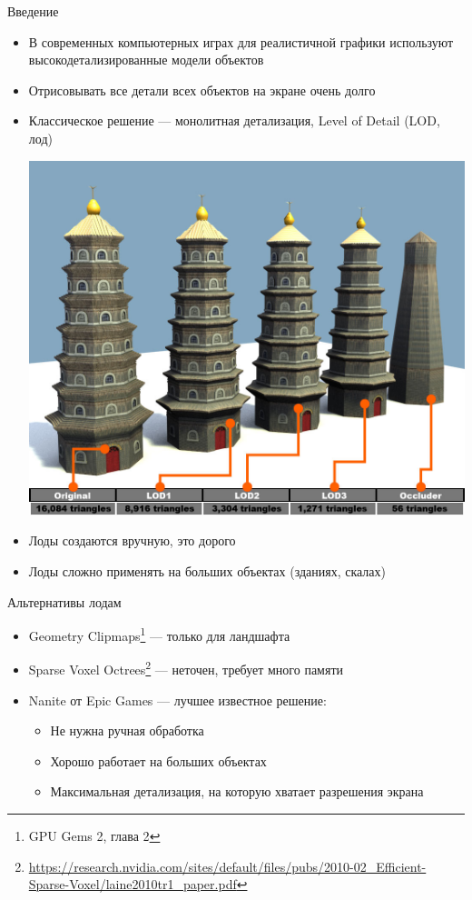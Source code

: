 \begin{frame}{Введение}
    \begin{itemize}
        \item В современных компьютерных играх для реалистичной графики используют высокодетализированные модели объектов
        \item Отрисовывать все детали всех объектов на экране очень долго
        \item Классическое решение --- монолитная детализация, Level of Detail (LOD, лод)
        \begin{center}
            \includegraphics[height=.4\textheight]{pics/lod.jpg}
        \end{center}
        \item Лоды создаются вручную, это дорого
        \item Лоды сложно применять на больших объектах (зданиях, скалах)
    \end{itemize}
\end{frame}

\begin{frame}{Альтернативы лодам}
    \begin{itemize}
        \item Geometry Clipmaps\footnote{GPU Gems 2, глава 2} --- только для ландшафта
        \item Sparse Voxel Octrees\footnote{\url{https://research.nvidia.com/sites/default/files/pubs/2010-02_Efficient-Sparse-Voxel/laine2010tr1_paper.pdf}} --- неточен, требует много памяти
        \item Nanite от Epic Games --- лучшее известное решение:
        \begin{itemize}
            \item Не нужна ручная обработка
            \item Хорошо работает на больших объектах
            \item Максимальная детализация, на которую хватает разрешения экрана
        \end{itemize}
    \end{itemize}
\end{frame}

